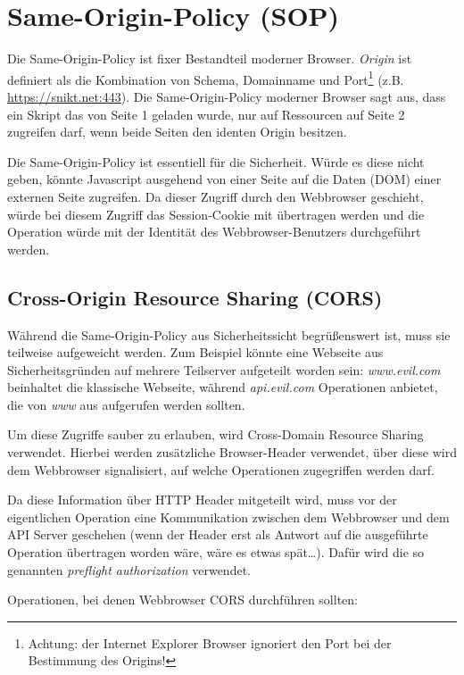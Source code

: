 \section{Same-Origin-Policy (SOP)}

Die Same-Origin-Policy ist fixer Bestandteil moderner Browser. \textit{Origin} ist definiert als die Kombination von Schema, Domainname und Port\footnote{Achtung: der Internet Explorer Browser ignoriert den Port bei der Bestimmung des Origins!} (z.B. \url{https://snikt.net:443}). Die Same-Origin-Policy moderner Browser sagt aus, dass ein Skript das von Seite 1 geladen wurde, nur auf Ressourcen auf Seite 2 zugreifen darf, wenn beide Seiten den identen Origin besitzen.

Die Same-Origin-Policy ist essentiell für die Sicherheit. Würde es diese nicht geben, könnte Javascript ausgehend von einer Seite auf die Daten (DOM) einer externen Seite zugreifen. Da dieser Zugriff durch den Webbrowser geschieht, würde bei diesem Zugriff das Session-Cookie mit übertragen werden und die Operation würde mit der Identität des Webbrowser-Benutzers durchgeführt werden.

\subsection{Cross-Origin Resource Sharing (CORS)}

Während die Same-Origin-Policy aus Sicherheitssicht begrüßenswert ist, muss sie teilweise aufgeweicht werden. Zum Beispiel könnte eine Webseite aus Sicherheitsgründen auf mehrere Teilserver aufgeteilt worden sein: \textit{www.evil.com} beinhaltet die klassische Webseite, während \textit{api.evil.com} Operationen anbietet, die von \textit{www} aus aufgerufen werden sollten.

Um diese Zugriffe sauber zu erlauben, wird Cross-Domain Resource Sharing verwendet. Hierbei werden zusätzliche Browser-Header verwendet, über diese wird dem Webbrowser signalisiert, auf welche Operationen zugegriffen werden darf.

Da diese Information über HTTP Header mitgeteilt wird, muss vor der eigentlichen Operation eine Kommunikation zwischen dem Webbrowser und dem API Server geschehen (wenn der Header erst als Antwort auf die ausgeführte Operation übertragen worden wäre, wäre es etwas spät\ldots). Dafür wird die so genannten \textit{preflight authorization} verwendet.

Operationen, bei denen Webbrowser CORS durchführen sollten:

